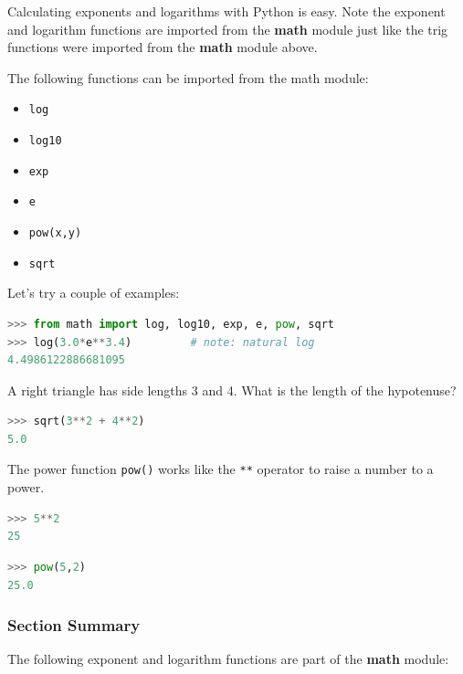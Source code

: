 \documentclass{book}
\providecommand{\tightlist}{%
      \setlength{\itemsep}{0pt}\setlength{\parskip}{0pt}}
\begin{document}
Calculating exponents and logarithms with Python is easy. Note the
exponent and logarithm functions are imported from the \textbf{math}
module just like the trig functions were imported from the \textbf{math}
module above.

The following functions can be imported from the math module:

\begin{itemize}
\tightlist
\item
  \lstinline!log!
\item
  \lstinline!log10!
\item
  \lstinline!exp!
\item
  \lstinline!e!
\item
  \lstinline!pow(x,y)!
\item
  \lstinline!sqrt!
\end{itemize}

Let's try a couple of examples:

\begin{lstlisting}[language=Python]
>>> from math import log, log10, exp, e, pow, sqrt
>>> log(3.0*e**3.4)         # note: natural log
4.4986122886681095
\end{lstlisting}

A right triangle has side lengths 3 and 4. What is the length of the
hypotenuse?

\begin{lstlisting}[language=Python]
>>> sqrt(3**2 + 4**2)
5.0 
\end{lstlisting}

The power function \lstinline!pow()! works like the \lstinline!**!
operator to raise a number to a power.

\begin{lstlisting}[language=Python]
>>> 5**2
25
\end{lstlisting}

\begin{lstlisting}[language=Python]
>>> pow(5,2)
25.0
\end{lstlisting}

\subsubsection{Section Summary}\label{section-summary}

The following exponent and logarithm functions are part of the
\textbf{math} module:
\end{document}
